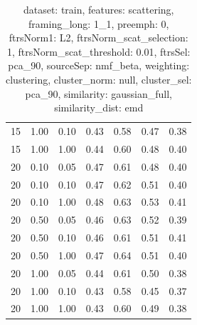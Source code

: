 \begin{table}
\begin{center}
\begin{tabular}{lllcccc}
15 & 1.00 & 0.10 & 0.43 & 0.58 & 0.47 & 0.38 \\ 
15 & 1.00 & 1.00 & 0.44 & 0.60 & 0.48 & 0.40 \\ 
20 & 0.10 & 0.05 & 0.47 & 0.61 & 0.48 & 0.40 \\ 
20 & 0.10 & 0.10 & 0.47 & 0.62 & 0.51 & 0.40 \\ 
20 & 0.10 & 1.00 & 0.48 & 0.63 & 0.53 & 0.41 \\ 
20 & 0.50 & 0.05 & 0.46 & 0.63 & 0.52 & 0.39 \\ 
20 & 0.50 & 0.10 & 0.46 & 0.61 & 0.51 & 0.41 \\ 
20 & 0.50 & 1.00 & 0.47 & 0.64 & 0.51 & 0.40 \\ 
20 & 1.00 & 0.05 & 0.44 & 0.61 & 0.50 & 0.38 \\ 
20 & 1.00 & 0.10 & 0.43 & 0.58 & 0.45 & 0.37 \\ 
20 & 1.00 & 1.00 & 0.43 & 0.60 & 0.49 & 0.38 \\ 
\end{tabular} 
\end{center} 
\caption{dataset: train, features: scattering, framing\_long: 1\_1, preemph: 0, ftrsNorm1: L2, ftrsNorm\_scat\_selection: 1, ftrsNorm\_scat\_threshold: 0.01, ftrsSel: pca\_90, sourceSep: nmf\_beta, weighting: clustering, cluster\_norm: null, cluster\_sel: pca\_90, similarity: gaussian\_full, similarity\_dist: emd} 
\label{datasetrFeaturscFraminlong1_1Preemp0Ftrsnorm1L2Ftrsnoscatselect1Ftrsnoscatthresh0.01Ftrsselpc90SourcesepnmbeWeightclClustenormnuClusteselpc90SimilagafuSimiladistem} 
\end{table} 
 

